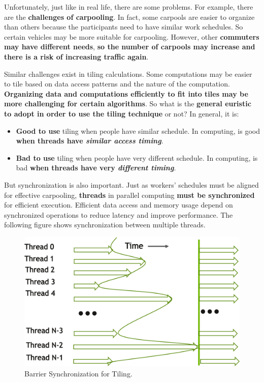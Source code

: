 \highspace
Unfortunately, just like in real life, there are some problems. For example, there are the \textbf{challenges of carpooling}. In fact, some carpools are easier to organize than others because the participants need to have similar work schedules. So certain vehicles may be more suitable for carpooling. However, other \textbf{commuters may have different needs}, \textbf{so the number of carpools may increase and there is a risk of increasing traffic again}.

\highspace
Similar challenges exist in tiling calculations. Some computations may be easier to tile based on data access patterns and the nature of the computation. \textbf{Organizing data and computations efficiently to fit into tiles may be more challenging for certain algorithms}. So what is the \textbf{general euristic to adopt in order to use the tiling technique} or not? In general, it is:
\begin{itemize}
    \item[\textcolor{Green3}{\faIcon{check}}] \textbf{\textcolor{Green3}{\textbf{Good}} to use} tiling when people have similar schedule. In computing, is good \textbf{when threads have \emph{similar access timing}}.

    \item[\textcolor{Red2}{\faIcon{times}}] \textbf{\textcolor{Red2}{\textbf{Bad}} to use} tiling when people have very different schedule. In computing, is bad \textbf{when threads have very \emph{different timing}}.
\end{itemize}
But synchronization is also important. Just as workers' schedules must be aligned for effective carpooling, \textbf{threads} in parallel computing \textbf{must be synchronized} for efficient execution. Efficient data access and memory usage depend on synchronized operations to reduce latency and improve performance. The following figure shows synchronization between multiple threads.

\begin{figure}[!htp]
    \centering
    \includegraphics[width=.8\textwidth]{img/cuda-tiling-1.pdf}
    \caption{Barrier Synchronization for Tiling.}
\end{figure}


